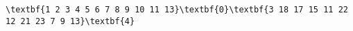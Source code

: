 \begin{verbatim}
\textbf{1 2 3 4 5 6 7 8 9 10 11 13}\textbf{0}\textbf{3 18 17 15 11 22 12 21 23 7 9 13}\textbf{4}\end{verbatim}